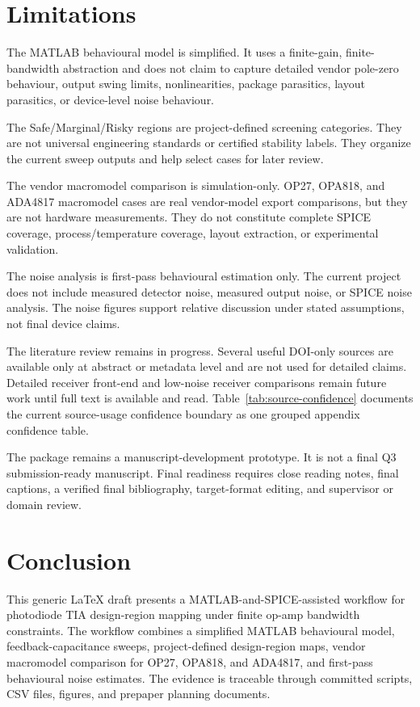 \section{Limitations}

The MATLAB behavioural model is simplified. It uses a finite-gain, finite-bandwidth abstraction and does not claim to capture detailed vendor pole-zero behaviour, output swing limits, nonlinearities, package parasitics, layout parasitics, or device-level noise behaviour.

The Safe/Marginal/Risky regions are project-defined screening categories. They are not universal engineering standards or certified stability labels. They organize the current sweep outputs and help select cases for later review.

The vendor macromodel comparison is simulation-only. OP27, OPA818, and ADA4817 macromodel cases are real vendor-model export comparisons, but they are not hardware measurements. They do not constitute complete SPICE coverage, process/temperature coverage, layout extraction, or experimental validation.

The noise analysis is first-pass behavioural estimation only. The current project does not include measured detector noise, measured output noise, or SPICE noise analysis. The noise figures support relative discussion under stated assumptions, not final device claims.

The literature review remains in progress. Several useful DOI-only sources are available only at abstract or metadata level and are not used for detailed claims. Detailed receiver front-end and low-noise receiver comparisons remain future work until full text is available and read. Table~\ref{tab:source-confidence} documents the current source-usage confidence boundary as one grouped appendix confidence table.

The package remains a manuscript-development prototype. It is not a final Q3 submission-ready manuscript. Final readiness requires close reading notes, final captions, a verified final bibliography, target-format editing, and supervisor or domain review.

\section{Conclusion}

This generic LaTeX draft presents a MATLAB-and-SPICE-assisted workflow for photodiode TIA design-region mapping under finite op-amp bandwidth constraints. The workflow combines a simplified MATLAB behavioural model, feedback-capacitance sweeps, project-defined design-region maps, vendor macromodel comparison for OP27, OPA818, and ADA4817, and first-pass behavioural noise estimates. The evidence is traceable through committed scripts, CSV files, figures, and prepaper planning documents.

